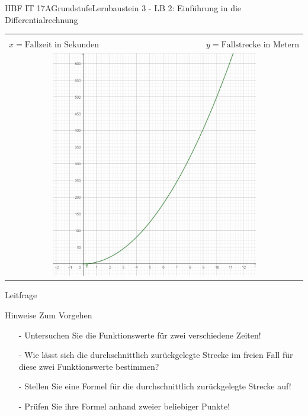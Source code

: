 \documentclass[oneside,openany,headings=optiontotoc,11pt,numbers=noenddot]{scrreprt}
\begin{document}
	\begin{worksheet}{HBF IT 17A}{Grundstufe}{Lernbaustein 3 - LB 2: Einführung in die Differentialrechnung}
		
		\noindent
		\begin{framed}
			\begin{center}
				\begin{tabular}{lcr}				
					\multicolumn{3}{c}{\fbox{\(f(x) = 5x^{2}\)}}\\
					\( x = \text{Fallzeit in Sekunden}\) &  & \( y = \text{Fallstrecke in Metern}\)\\
					\multicolumn{3}{c}{\includegraphics[width=0.7\textwidth]{20180219-EinDiffFall.jpg}}
				\end{tabular}
			\end{center}
		\end{framed}

		\setlength{\fboxsep}{1mm}
		\begin{framed}
			\tiny{\color{codegray}Leitfrage}\\
			\par
			\bigskip
		\end{framed}
	
		\begin{framed}
			\tiny{\color{codegray}Hinweise Zum Vorgehen}
			\normalsize
			\color{black}
				\begin{itemize}
					\itemsep0em
					\item[-] Untersuchen Sie die Funktionswerte für zwei verschiedene Zeiten!\\
					\item[-] Wie lässt sich die durchschnittlich zurückgelegte Strecke im freien Fall für diese zwei Funktionswerte bestimmen?\\
					\item[-] Stellen Sie eine Formel für die durchschnittlich zurückgelegte Strecke auf!\\
					\item[-] Prüfen Sie ihre Formel anhand zweier beliebiger Punkte!
				\end{itemize}
		\end{framed}
	

\end{worksheet}
\end{document}
